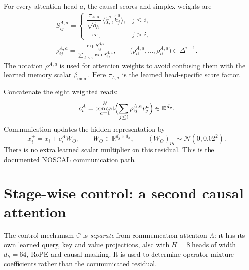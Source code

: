\documentclass[11pt,a4paper]{article}
\newcommand{\R}{\mathbb{R}}
\begin{document}
For every attention head $a$, the causal scores and simplex weights are
\begin{gather}
S_{ij}^{A,a}=\begin{cases}\dfrac{\tau_{A,a}}{\sqrt{d_h}}\,\langle\tilde q_i^a,\tilde k_j^a\rangle, & j\le i,\\[4pt] -\infty, & j>i,\end{cases}\\
\rho_{ij}^{A,a}=\frac{\exp S_{ij}^{A,a}}{\sum_{\ell\le i}\exp S_{i\ell}^{A,a}},\qquad
\bigl(\rho_{i1}^{A,a},\dots,\rho_{ii}^{A,a}\bigr)\in\Delta^{i-1}.
\end{gather}
The notation $\rho^{A,a}$ is used for attention weights to avoid confusing them with the learned memory
scalar $\beta_{\mathrm{mem}}$. Here $\tau_{A,a}$ is the learned head-specific score factor.

Concatenate the eight weighted reads:
\begin{equation}
c_i^A=\operatorname*{concat}_{a=1}^{H}\Bigl(\sum_{j\le i}\rho_{ij}^{A,a}v_j^a\Bigr)\in\R^{d_g}.
\end{equation}
Communication updates the hidden representation by
\begin{equation}
x_i^{+}=x_i+c_i^AW_O,\qquad W_O\in\R^{d_g\times d_x},\qquad (W_O)_{pq}\sim\mathcal N(0,0.02^2).
\end{equation}
There is no extra learned scalar multiplier on this residual. This is the documented NOSCAL
communication path.

\section{Stage-wise control: a second causal attention}

The control mechanism $C$ is \emph{separate} from communication attention $A$: it has its own learned
query, key and value projections, also with $H=8$ heads of width $d_h=64$, RoPE and causal masking. It is
used to determine operator-mixture coefficients rather than the communicated residual.
\end{document}
